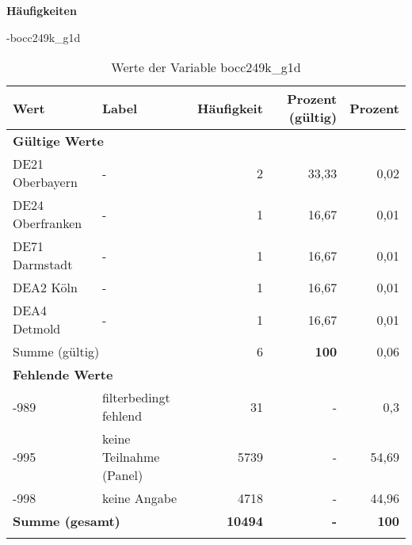         		\vspace*{0.5cm}
                \noindent\textbf{Häufigkeiten}

                \vspace*{-\baselineskip}
					\begin{filecontents}{\jobname-bocc249k_g1d}
					\begin{longtable}{Xlrrr}
					\toprule
					\textbf{Wert} & \textbf{Label} & \textbf{Häufigkeit} & \textbf{Prozent (gültig)} & \textbf{Prozent} \\
					\endhead
					\midrule
					\multicolumn{5}{l}{\textbf{Gültige Werte}}\\

					\multicolumn{1}{X}{DE21 Oberbayern} &
					- &
					2 &
					33,33 &
					0,02 \\
					
					\multicolumn{1}{X}{DE24 Oberfranken} &
					- &
					1 &
					16,67 &
					0,01 \\
					
					\multicolumn{1}{X}{DE71 Darmstadt} &
					- &
					1 &
					16,67 &
					0,01 \\
					
					\multicolumn{1}{X}{DEA2 Köln} &
					- &
					1 &
					16,67 &
					0,01 \\
					
					\multicolumn{1}{X}{DEA4 Detmold} &
					- &
					1 &
					16,67 &
					0,01 \\
					\midrule
						\multicolumn{2}{l}{Summe (gültig)} & 6 &
						\textbf{100} &
					    0,06 \\
					\multicolumn{5}{l}{\textbf{Fehlende Werte}}\\
							-989 & filterbedingt fehlend & 31 & - & 0,3 \\

							-995 & keine Teilnahme (Panel) & 5739 & - & 54,69 \\

							-998 & keine Angabe & 4718 & - & 44,96 \\

					\midrule
					\multicolumn{2}{l}{\textbf{Summe (gesamt)}} & \textbf{10494} & \textbf{-} & \textbf{100} \\
					\bottomrule
					\caption{Werte der Variable bocc249k\_g1d}
					\end{longtable}
					\end{filecontents}



